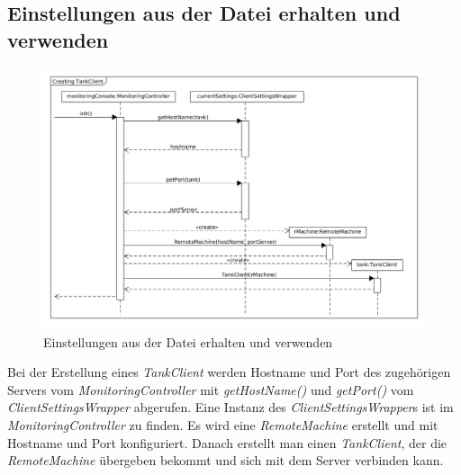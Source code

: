 \documentclass[parskip=full]{scrartcl}
\begin{document}
\subsection{Einstellungen aus der Datei erhalten und verwenden}
\begin{figure}[H]
  \centering
  \includegraphics[scale=0.4]{design/sequence-diagrams/getting-networking-settings.png}
  \caption{Einstellungen aus der Datei erhalten und verwenden}
\end{figure}
Bei der Erstellung eines \emph{TankClient} werden Hostname und Port des zugehörigen Servers vom \emph{MonitoringController} mit \emph{getHostName()}
und \emph{getPort()} vom \emph{ClientSettingsWrapper} abgerufen. Eine Instanz des \emph{ClientSettingsWrapper}s
ist im \emph{MonitoringController} zu finden. Es wird eine \emph{RemoteMachine} erstellt und mit Hostname und Port konfiguriert.
Danach erstellt man einen \emph{TankClient}, der die \emph{RemoteMachine} übergeben bekommt und sich mit dem Server verbinden kann.
\end{document}
